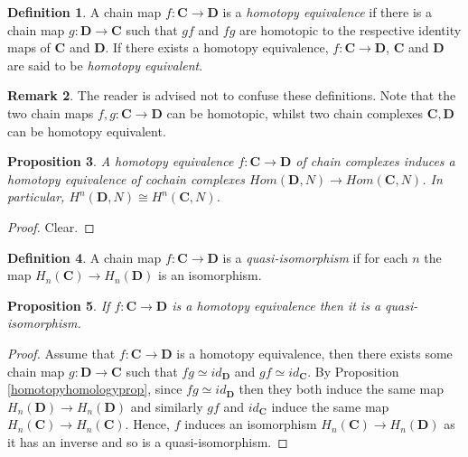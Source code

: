 \documentclass[11.5pt, twoside, a4paper, titlepage]{report}
\theoremstyle{definition}
\newtheorem{mydef}{Definition}[section]
\newtheorem{rem}[mydef]{Remark}
\theoremstyle{plain}
\newtheorem{prop}[mydef]{Proposition}
\begin{document}
\begin{mydef}
A chain map $f:\mathbf{C} \to \mathbf{D}$ is a \emph{homotopy equivalence} if there is a chain map $g:\mathbf{D} \to \mathbf{C}$ such that $gf$ and $fg$ are homotopic to the respective identity maps of $\mathbf{C}$ and $\mathbf{D}$.
If there exists a homotopy equivalence, $f:\mathbf{C} \to \mathbf{D}$, $\mathbf{C}$ and $\mathbf{D}$ are said to be \emph{homotopy equivalent}.
\end{mydef}

\begin{rem}
The reader is advised not to confuse these definitions. Note that the two chain maps $f,g:\mathbf{C} \to \mathbf{D}$ can be homotopic, whilst two chain complexes $\mathbf{C}, \mathbf{D}$ can be homotopy equivalent.
\end{rem}

\begin{prop}
A homotopy equivalence $f:\mathbf{C} \to \mathbf{D}$ of chain complexes induces a homotopy equivalence of cochain complexes $Hom(\mathbf{D},N) \to Hom(\mathbf{C},N)$. In particular, $H^n(\mathbf{D}, N) \cong H^n(\mathbf{C}, N)$.
\end{prop}
\begin{proof}
Clear.
\end{proof}

\begin{mydef}
A chain map $f:\mathbf{C} \to \mathbf{D}$ is a \emph{quasi-isomorphism} if for each $n$ the map $H_n(\mathbf{C}) \to H_n(\mathbf{D})$ is an isomorphism.
\end{mydef}

\begin{prop} \label{homequivisomprop}
If $f:\mathbf{C} \to \mathbf{D}$ is a homotopy equivalence then it is a quasi-isomorphism.
\end{prop}
\begin{proof}
Assume that $f: \mathbf{C} \to \mathbf{D}$ is a homotopy equivalence, then there exists some chain map $g: \mathbf{D} \to \mathbf{C}$ such that $fg \simeq id_{\mathbf{D}}$ and $gf\simeq id_{\mathbf{C}}$. By Proposition \ref{homotopyhomologyprop}, since $fg \simeq id_{\mathbf{D}}$ then they both induce the same map $H_n(\mathbf{D}) \to H_n(\mathbf{D})$ and similarly $gf$ and $id_{\mathbf{C}}$ induce the same map $H_n(\mathbf{C}) \to H_n(\mathbf{C})$. Hence, $f$ induces an isomorphism $H_n(\mathbf{C}) \to H_n(\mathbf{D})$ as it has an inverse and so is a quasi-isomorphism.
\end{proof}
\end{document}
